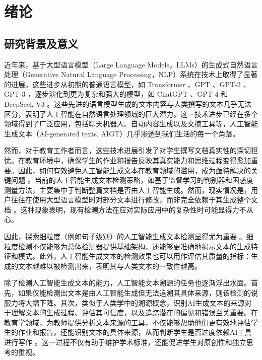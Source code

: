 
\chapter{绪论}
\label{chap:intro}

\section{研究背景及意义}

近年来，基于大型语言模型（Large Language Models，LLMs）的生成式自然语言处理（Generative Natural Language Processing，NLP）系统在技术上取得了显著的进展。这些进步从初期的普通语言模型，如 Transformer \cite{transformer}、GPT \cite{gpt}、GPT-2 \cite{gpt2}、GPT-3 \cite{gpt3}，逐步演化到更为复杂和强大的模型，如 ChatGPT \cite{chatgpt}、GPT-4 \cite{openai2024gpt4} 和 DeepSeek V3 \cite{deepseekai2024deepseekv3technicalreport}。这些先进的语言模型生成的文本内容与人类撰写的文本几乎无法区分，表明了人工智能在自然语言处理领域的巨大潜力。这一技术进步已经在多个领域得到了广泛应用，包括聊天机器人、自动内容生成以及文摘工具等，人工智能生成文本（AI-generated texts, AIGT）几乎渗透到我们生活的每一个角落。

然而，对于教育工作者而言，这些技术进展引发了对学生撰写文档真实性的深切担忧。在教育环境中，确保学生的作业和报告反映其真实能力和思维过程变得愈加重要。因此，如何有效避免人工智能生成文本在教育领域的滥用，成为亟待解决的关键问题 \cite{guo_how_2023}。当前的人工智能生成文本检测策略，如基于监督学习的判别器和困惑度测量方法，主要集中于判断整篇文档是否由人工智能生成。然而，现实情况是，用户往往在使用大型语言模型时对部分文本进行修改，而非完全依赖于其生成整个文档 \cite{wang_llm-detector_2024}。这种现象表明，现有检测方法在应对实际应用中的复杂性时可能显得力不从心。

因此，探索细粒度（例如句子级别）的人工智能生成文本检测显得尤为重要 \cite{wang_seqxgpt_2023}。细粒度检测不仅能够为总体检测器提供基础架构，还能够更准确地揭示文本的生成特征和模式。此外，人工智能生成文本的检测效果也可以用作评估其质量的指标：生成的文本越难以被检测出来，表明其与人类文本的一致性越高。

除了检测人工智能生成文本的能力，人工智能文本溯源的任务也逐渐浮出水面。首先，如果仅能检测出文本是由人工智能生成但无法追溯其具体来源，则该检测的说服力将大幅下降。其次，类似于人类学中的溯源概念，识别AI生成文本的来源对于理解文本的生成过程、评估其可信度，以及追踪潜在的偏见和错误至关重要。在教育学领域，为教师提供分析文本来源的工具，不仅能够帮助他们更有效地评估学生的作业和报告，还能识别文本的具体来源，从而判断学生是否过度依赖AI工具进行写作 \cite{li_origin_2023}。这一过程不仅有助于维护学术标准，还能促进学生对原创性和独立思考的重视。

